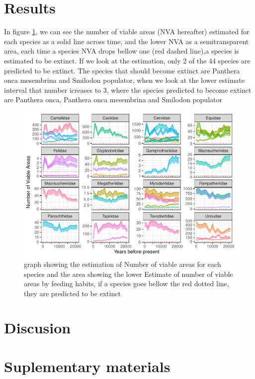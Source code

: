 \documentclass[]{article}
\begin{document}
\hypertarget{results}{%
\section{Results}\label{results}}

In figure \ref{fig:NVAGraph}, we can see the number of viable areas (NVA hereafter) estimated for each species as a solid line across time, and the lower NVA as a semitransparent area, each time a species NVA drops bellow one (red dashed line),a species is estimated to be extinct. If we look at the estimation, only 2 of the 44 species are predicted to be extinct. The species that should become extinct are Panthera onca mesembrina and Smilodon populator, when we look at the lower estimate interval that number icreases to 3, where the species predicted to become extinct are Panthera onca, Panthera onca mesembrina and Smilodon populator

\begin{figure}
\centering
\includegraphics{Manuscript_files/figure-latex/NVAGraph-1.pdf}
\caption{\label{fig:NVAGraph}graph showing the estimation of Number of viable areas for each species and the area showing the lower Estimate of number of viable areas by feeding habits, if a species goes bellow the red dotted line, they are predicted to be extinct}
\end{figure}

\hypertarget{discusion}{%
\section{Discusion}\label{discusion}}

\hypertarget{suplementary-materials}{%
\section{Suplementary materials}\label{suplementary-materials}}
\end{document}
